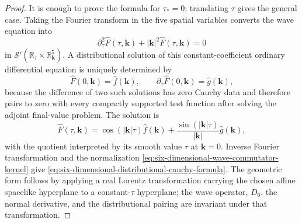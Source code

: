 \begin{proof}
It is enough to prove the formula for \(\tau_*=0\); translating \(\tau\)
gives the general case.  Taking the Fourier transform in the five spatial
variables converts the wave equation into
\begin{equation}
  \partial_\tau^2\widehat F(\tau,\mathbf k)
  +
  |\mathbf k|^2\widehat F(\tau,\mathbf k)=0
  \label{eq:six-dimensional-wave-spatial-fourier-ode}
\end{equation}
in \(\mathcal S'(\mathbb R_\tau\times\mathbb R^5_{\mathbf k})\).  A
distributional solution of this constant-coefficient ordinary differential
equation is uniquely determined by
\[
  \widehat F(0,\mathbf k)=\widehat f(\mathbf k),
  \qquad
  \partial_\tau\widehat F(0,\mathbf k)=\widehat g(\mathbf k),
\]
because the difference of two such solutions has zero Cauchy data and
therefore pairs to zero with every compactly supported test function after
solving the adjoint final-value problem.  The solution is
\begin{equation}
  \widehat F(\tau,\mathbf k)
  =
  \cos(|\mathbf k|\tau)\widehat f(\mathbf k)
  +
  \frac{\sin(|\mathbf k|\tau)}{|\mathbf k|}\widehat g(\mathbf k),
  \label{eq:six-dimensional-wave-fourier-solution}
\end{equation}
with the quotient interpreted by its smooth value \(\tau\) at
\(\mathbf k=0\).  Inverse Fourier transformation and the normalization
\eqref{eq:six-dimensional-wave-commutator-kernel} give
\eqref{eq:six-dimensional-distributional-cauchy-formula}.  The geometric
form follows by applying a real Lorentz transformation carrying the chosen
affine spacelike hyperplane to a constant-\(\tau\) hyperplane; the wave
operator, \(D_6\), the normal derivative, and the distributional pairing are
invariant under that transformation.
\end{proof}

